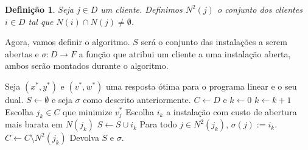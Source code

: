 \documentclass[12pt]{article}
\newtheorem{definition}[theorem]{Definição}
\begin{document}
\begin{definition}
    Seja $j\in D$ um cliente. Definimos $N^2(j)$ o conjunto dos clientes $i \in D$ tal que $N(i) \cap N(j) \not = \emptyset$.
\end{definition}
Agora, vamos definir o algoritmo. $S$ será o conjunto das instalações a serem abertas e $\sigma : D \rightarrow F $ a função que atribui um cliente a uma instalação aberta, ambos serão montados durante o algoritmo.
\begin{algorithm}
    \begin{algorithmic}[1]
        \State Seja $(x^*,y^*)$ e $(v^*,w^*)$ uma resposta ótima para o programa linear e o seu dual.
        \State $S \gets \emptyset$ e seja $\sigma$ como descrito anteriormente.
        \State $C \gets D$ e $k \gets 0$
        \State $k \gets k+1$
        \State Escolha $j_k \in C$ que minimize $v_j^*$
        \State Escolha $i_k $ a instalação com custo de abertura mais barata em  $N(j_k)$
        \State $S \gets S \cup i_k$
        \State Para todo $j \in N^2(j_k)$, $\sigma(j) := i_k$.
        \State $C \gets C \setminus N^2(j_k)$
        \EndWhile
        \State Devolva $S$ e $\sigma$.
        \EndFunction
    \end{algorithmic}
\end{algorithm}
\end{document}
